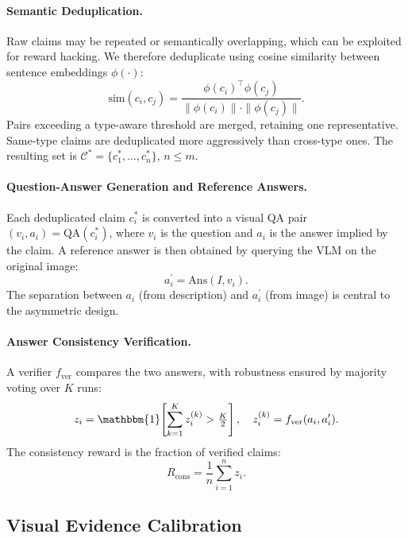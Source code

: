 \paragraph{Semantic Deduplication.}
Raw claims may be repeated or semantically overlapping, which can be exploited for reward hacking. We therefore deduplicate using cosine similarity between sentence embeddings $\phi(\cdot)$:
\begin{equation}
    \mathrm{sim}(c_i,c_j) = \frac{\phi(c_i)^\top \phi(c_j)}{\|\phi(c_i)\|\cdot\|\phi(c_j)\|}.
\end{equation}
Pairs exceeding a type-aware threshold are merged, retaining one representative. Same-type claims are deduplicated more aggressively than cross-type ones. The resulting set is $\mathcal{C}^{\ast} = \{c_1^{\ast},\ldots,c_n^{\ast}\}$, $n \leq m$.

\paragraph{Question-Answer Generation and Reference Answers.}
Each deduplicated claim $c_i^{\ast}$ is converted into a visual QA pair $(v_i, a_i) = \mathrm{QA}(c_i^{\ast})$, where $v_i$ is the question and $a_i$ is the answer implied by the claim. A reference answer is then obtained by querying the VLM on the original image:
\begin{equation}
    a_i^{\prime} = \mathrm{Ans}(I, v_i).
\end{equation}
The separation between $a_i$ (from description) and $a_i^{\prime}$ (from image) is central to the asymmetric design.

\paragraph{Answer Consistency Verification.}
A verifier $f_{\mathrm{ver}}$ compares the two answers, with robustness ensured by majority voting over $K$ runs:
\begin{equation}
    z_i = \mathbbm{1}\!\left[\sum_{k=1}^{K} z_i^{(k)} > \tfrac{K}{2}\right], \quad z_i^{(k)} = f_{\mathrm{ver}}(a_i, a_i^{\prime}).
\end{equation}
The consistency reward is the fraction of verified claims:
\begin{equation}
    R_{\mathrm{cons}} = \frac{1}{n}\sum_{i=1}^{n} z_i.
\end{equation}

\subsection{Visual Evidence Calibration}
\label{sec:vec}

